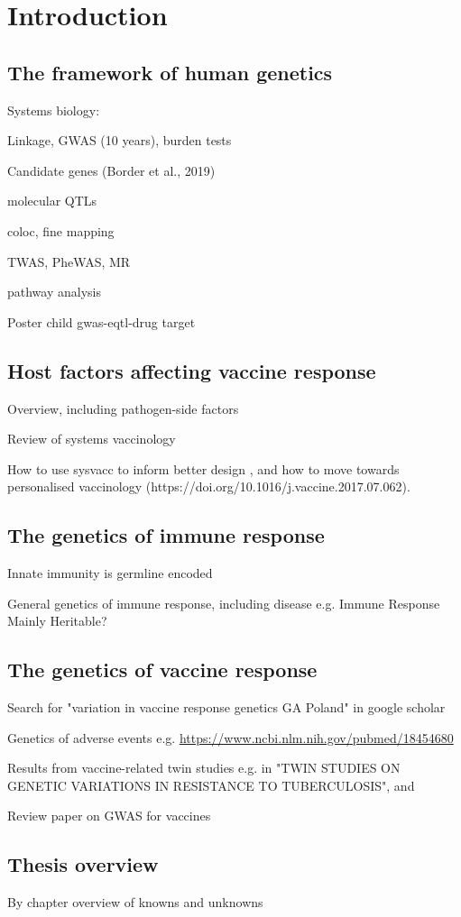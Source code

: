 %
%

\chapter{Introduction}

\section{The framework of human genetics}

Systems biology:

Linkage, GWAS (10 years), burden tests

Candidate genes (Border et al., 2019)

molecular QTLs

coloc, fine mapping

TWAS, PheWAS\autocite{vermaCurrentScopeChallenges2017}, MR

pathway analysis

Poster child gwas-eqtl-drug target

\section{Host factors affecting vaccine response}

Overview, including pathogen-side factors

Review of systems vaccinology

How to use sysvacc to inform better design \autocite{Mooney2013a}, and how to move towards personalised vaccinology (https://doi.org/10.1016/j.vaccine.2017.07.062).

\section{The genetics of immune response}

Innate immunity is germline encoded

General genetics of immune response, including disease e.g. Immune Response Mainly Heritable? 

\section{The genetics of vaccine response}

Search for "variation in vaccine response genetics GA Poland" in google scholar

Genetics of adverse events e.g. \url{https://www.ncbi.nlm.nih.gov/pubmed/18454680}

Results from vaccine-related twin studies e.g. in "TWIN STUDIES ON GENETIC VARIATIONS IN RESISTANCE TO TUBERCULOSIS", and \autocite{Qi2016} 

Review paper on GWAS for vaccines \autocite{Mooney2013}

\section{Thesis overview}

By chapter overview of knowns and unknowns

